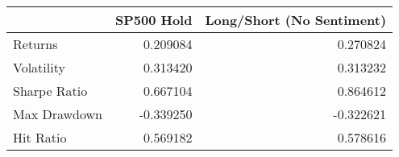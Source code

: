 \begin{tabular}{lrr}
\toprule
{} &  SP500 Hold &  Long/Short (No Sentiment) \\
\midrule
Returns      &    0.209084 &                   0.270824 \\
Volatility   &    0.313420 &                   0.313232 \\
Sharpe Ratio &    0.667104 &                   0.864612 \\
Max Drawdown &   -0.339250 &                  -0.322621 \\
Hit Ratio    &    0.569182 &                   0.578616 \\
\bottomrule
\end{tabular}
